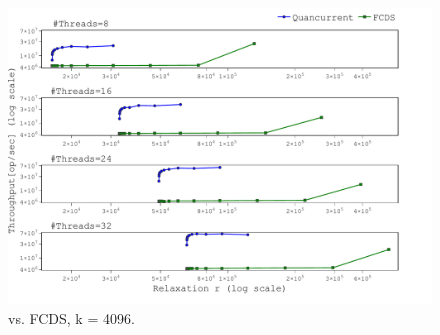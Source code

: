 
\begin{figure}[h]
\includegraphics[width=\textwidth,trim={0cm 0cm 0cm 0cm},clip]
{graphics/graphs/FCDS/oracle_Quancurrent_vs_FCDS_blocking_numa_update_k4096_keys10M_T8_16_24_32_runs15_equal_relax_log_scale_largeB_removed_last2_17-08-2022_18-46-29.pdf}
\caption{\mysketch vs. FCDS, k = 4096.}
\label{fig:compare_FCDS_k4096}
\end{figure}

